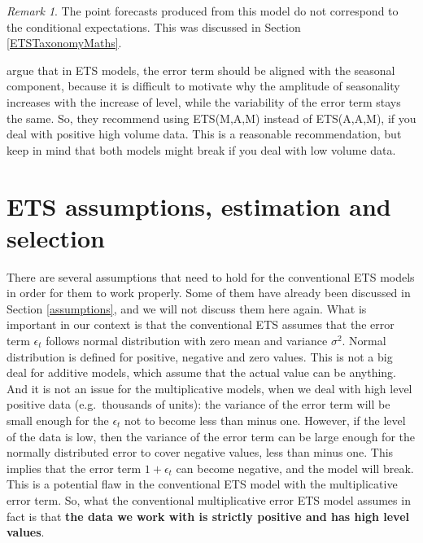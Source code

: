 \documentclass[
]{book}
\theoremstyle{definition}
\theoremstyle{definition}
\theoremstyle{definition}
\theoremstyle{definition}
\theoremstyle{remark}
\newtheorem*{remark}{Remark}
\begin{document}
\begin{remark}
The point forecasts produced from this model do not correspond to the conditional expectations. This was discussed in Section \ref{ETSTaxonomyMaths}.
\end{remark}

\citet{Hyndman2008b} argue that in ETS models, the error term should be aligned with the seasonal component, because it is difficult to motivate why the amplitude of seasonality increases with the increase of level, while the variability of the error term stays the same. So, they recommend using ETS(M,A,M) instead of ETS(A,A,M), if you deal with positive high volume data. This is a reasonable recommendation, but keep in mind that both models might break if you deal with low volume data.

\hypertarget{ets-assumptions-estimation-and-selection}{%
\section{ETS assumptions, estimation and selection}\label{ets-assumptions-estimation-and-selection}}

There are several assumptions that need to hold for the conventional ETS models in order for them to work properly. Some of them have already been discussed in Section \ref{assumptions}, and we will not discuss them here again. What is important in our context is that the conventional ETS assumes that the error term \(\epsilon_t\) follows normal distribution with zero mean and variance \(\sigma^2\). Normal distribution is defined for positive, negative and zero values. This is not a big deal for additive models, which assume that the actual value can be anything. And it is not an issue for the multiplicative models, when we deal with high level positive data (e.g.~thousands of units): the variance of the error term will be small enough for the \(\epsilon_t\) not to become less than minus one. However, if the level of the data is low, then the variance of the error term can be large enough for the normally distributed error to cover negative values, less than minus one. This implies that the error term \(1+\epsilon_t\) can become negative, and the model will break. This is a potential flaw in the conventional ETS model with the multiplicative error term. So, what the conventional multiplicative error ETS model assumes in fact is that \textbf{the data we work with is strictly positive and has high level values}.
\end{document}
